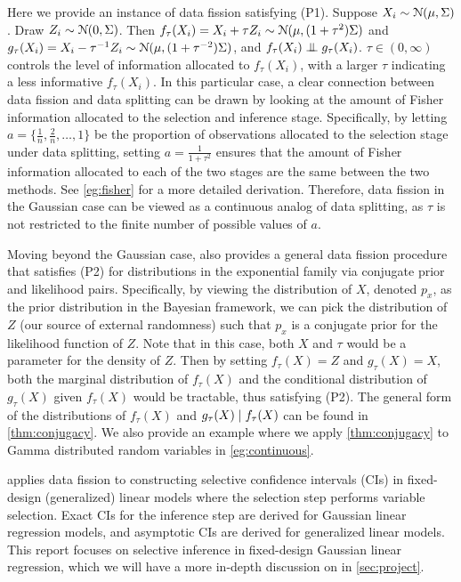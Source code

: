 Here we provide an instance of data fission satisfying (P1). Suppose $X_i\sim \mathcal{N}(\mu, \Sigma)$. Draw $Z_i\sim\mathcal{N}(0,\Sigma)$. Then $f_\tau(X_i) = X_i + \tau Z_i \sim \mathcal{N}(\mu, (1+\tau^2)\Sigma)$ and $g_\tau(X_i) = X_i-\tau^{-1}Z_i \sim \mathcal{N}(\mu, (1+\tau^{-2})\Sigma)$, and $f_\tau(X_i) \indep g_\tau(X_i)$. $\tau\in(0,\infty)$ controls the level of information allocated to $f_\tau(X_i)$, with a larger $\tau$ indicating a less informative $f_\tau(X_i)$. In this particular case, a clear connection between data fission and data splitting can be drawn by looking at the amount of Fisher information allocated to the selection and inference stage. Specifically, by letting $a=\{\frac{1}{n}, \frac{2}{n}, \dots, 1\}$ be the proportion of observations allocated to the selection stage under data splitting, setting $a=\frac{1}{1+\tau^2}$ ensures that the amount of Fisher information allocated to each of the two stages are the same between the two methods. See \cref{eg:fisher} for a more detailed derivation. Therefore, data fission in the Gaussian case can be viewed as a continuous analog of data splitting, as $\tau$ is not restricted to the finite number of possible values of $a$.

Moving beyond the Gaussian case, \cite{leiner2022data} also provides a general data fission procedure that satisfies (P2) for distributions in the exponential family via conjugate prior and likelihood pairs. Specifically, by viewing the distribution of $X$, denoted $p_x$, as the prior distribution in the Bayesian framework, we can pick the distribution of $Z$ (our source of external randomness) such that $p_x$ is a conjugate prior for the likelihood function of $Z$. Note that in this case, both $X$ and $\tau$ would be a parameter for the density of $Z$. Then by setting $f_\tau(X)=Z$ and $g_\tau(X)=X$, both the marginal distribution of $f_\tau(X)$ and the conditional distribution of $g_\tau(X)$ given $f_\tau(X)$ would be tractable, thus satisfying (P2). The general form of the distributions of $f_\tau(X)$ and $g_\tau(X)\mid f_\tau(X)$ can be found in \cref{thm:conjugacy}. We also provide an example where we apply \cref{thm:conjugacy} to Gamma distributed random variables in \cref{eg:continuous}.

\cite{leiner2022data} applies data fission to constructing selective confidence intervals (CIs) in fixed-design (generalized) linear models where the selection step performs variable selection. Exact CIs for the inference step are derived for Gaussian linear regression models, and asymptotic CIs are derived for generalized linear models. This report focuses on selective inference in fixed-design Gaussian linear regression, which we will have a more in-depth discussion on in \cref{sec:project}.